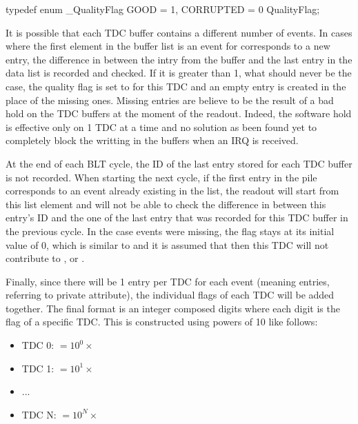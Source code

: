	\begin{code}
    \begin{cppcode}
typedef enum _QualityFlag {
    GOOD      = 1,
    CORRUPTED = 0
} QualityFlag;
    \end{cppcode}
	\label{cpp:qflag}
    \vspace{5mm}
    \end{code}
	
	It is possible that each TDC buffer contains a different number of events. In cases where the first element in the buffer list is an event for corresponds to a new entry, the difference in between the intry from the buffer and the last entry in the data list is recorded and checked. If it is greater than 1, what should never be the case, the quality flag is set to  for this TDC and an empty entry is created in the place of the missing ones. Missing entries are believe to be the result of a bad hold on the TDC buffers at the moment of the readout. Indeed, the software hold is effective only on 1 TDC at a time and no solution as been found yet to completely block the writting in the buffers when an IRQ is received.
	
	At the end of each BLT cycle, the ID of the last entry stored for each TDC buffer is not recorded. When starting the next cycle, if the first entry in the pile corresponds to an event already existing in the list, the readout will start from this list element and will not be able to check the difference in between this entry's ID and the one of the last entry that was recorded for this TDC buffer in the previous cycle. In the case events were missing, the flag stays at its initial value of 0, which is similar to  and it is assumed that then this TDC will not contribute to ,  or .
	
	Finally, since there will be 1  entry per TDC for each event (meaning  entries, referring to  private attribute), the individual flags of each TDC will be added together. The final format is an integer composed  digits where each digit is the flag of a specific TDC. This is constructed using powers of 10 like follows:
	
	\begin{itemize}
		\item[] TDC 0:  $= 10^0 \times$ 
		\item[] TDC 1:  $= 10^1 \times$ 
		\item[] ...
		\item[] TDC N:  $= 10^N \times$ 
	\end{itemize}
                         
